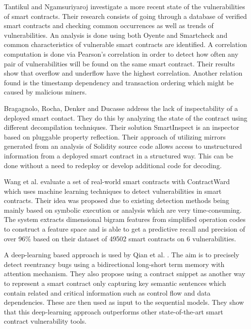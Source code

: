 \documentclass[10pt,conference]{IEEEtran}
\begin{document}
Tantikul and Ngamsuriyaroj \cite{icissp20} investigate a more recent state of the vulnerabilities of smart contracts. Their research consists of going through a database of verified smart contracts and checking common occurrences as well as trends of vulnerabilities. An analysis is done using both Oyente and Smartcheck and common characteristics of vulnerable smart contracts are identified. A correlation computation is done via Pearson's correlation in order to detect how often any pair of vulnerabilities will be found on the same smart contract. Their results show that overflow and underflow have the highest correlation. Another relation found is the timestamp dependency and transaction ordering which might be caused by malicious miners.  

Bragagnolo, Rocha, Denker and Ducasse \cite{rocha} address the lack of inspectability of a deployed smart contact. They do this by analyzing the state of the contract using different decompilation techniques. Their solution SmartInspect is an inspector based on pluggable property reflection. Their approach of utilizing mirrors generated from an analysis of Solidity source code allows access to unstructured information from a deployed smart contract in a structured way. This can be done without a need to redeploy or develop additional code for decoding. 

Wang et al. \cite{contractward} evaluate a set of real-world smart contracts with ContractWard which uses machine learning techniques to detect vulnerabilities in smart contracts. Their idea was proposed due to existing detection methods being mainly based on symbolic execution or analysis which are very time-consuming. The system extracts dimensional bigram features from simplified operation codes to construct a feature space and is able to get a predictive recall and precision of over 96\% based on their dataset of 49502 smart contracts on 6 vulnerabilities.

A deep-learning based approach is used by Qian et al. \cite{automated}. The aim is to precisely detect reentrancy bugs using a bidirectional long-short term memory with attention mechanism. They also propose using a contract snippet as another way to represent a smart contract only capturing key semantic sentences which contain related and critical information such as control flow and data dependencies. These are then used as input to the sequential models. They show that this deep-learning approach outperforms other state-of-the-art smart contract vulnerability tools.
\end{document}
